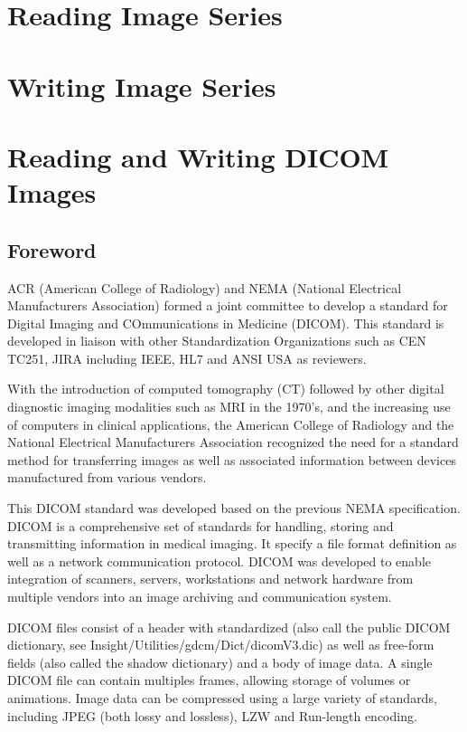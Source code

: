 \section{Reading Image Series}
\label{sec:ReadingImageSeries}




\section{Writing Image Series}
\label{sec:WritingImageSeries}


\section{Reading and Writing DICOM Images}
\label{sec:ReadingDicomImageSeries2}


\subsection{Foreword}
ACR (American College of Radiology) and NEMA (National Electrical Manufacturers Association)
formed a joint committee to develop a standard for Digital Imaging and COmmunications in Medicine (DICOM).
This standard is developed in liaison with other Standardization Organizations such as CEN TC251, JIRA including IEEE, HL7 and ANSI USA as reviewers.

With the introduction of computed tomography (CT) followed by other digital diagnostic imaging modalities such as MRI in the 1970's, and the increasing use of computers in clinical applications, the American
College of Radiology and the National Electrical Manufacturers Association recognized
the need for a standard method for transferring images as well as associated information between
devices manufactured from various vendors.

This DICOM standard was developed based on the previous NEMA specification. 
DICOM is a comprehensive set of standards for handling, storing and transmitting information in 
medical imaging. It specify a file format definition as well as a network communication protocol.
DICOM was developed to enable integration of scanners, servers, workstations and network hardware from
multiple vendors into an image archiving and communication system.

DICOM files consist of a header with standardized (also call the public DICOM dictionary, see 
Insight/Utilities/gdcm/Dict/dicomV3.dic) as well as free-form fields (also called the shadow dictionary) 
and a body of image data. A single DICOM file can contain multiples frames, 
allowing storage of volumes or animations. Image data can be compressed using a large variety of 
standards, including JPEG (both lossy and lossless), LZW and Run-length encoding.

